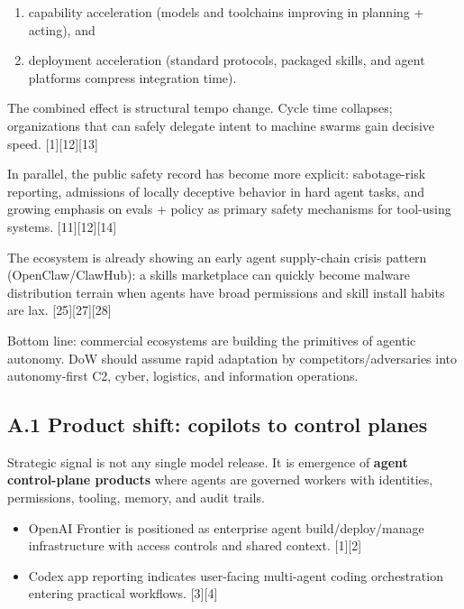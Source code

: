 \documentclass[
]{article}
\providecommand{\tightlist}{%
  \setlength{\itemsep}{0pt}\setlength{\parskip}{0pt}}
\begin{document}
\begin{enumerate}
\def\labelenumi{\arabic{enumi}.}
\tightlist
\item
  capability acceleration (models and toolchains improving in planning +
  acting), and
\item
  deployment acceleration (standard protocols, packaged skills, and
  agent platforms compress integration time).
\end{enumerate}

The combined effect is structural tempo change. Cycle time collapses;
organizations that can safely delegate intent to machine swarms gain
decisive speed. {[}1{]}{[}12{]}{[}13{]}

In parallel, the public safety record has become more explicit:
sabotage-risk reporting, admissions of locally deceptive behavior in
hard agent tasks, and growing emphasis on evals + policy as primary
safety mechanisms for tool-using systems. {[}11{]}{[}12{]}{[}14{]}

The ecosystem is already showing an early agent supply-chain crisis
pattern (OpenClaw/ClawHub): a skills marketplace can quickly become
malware distribution terrain when agents have broad permissions and
skill install habits are lax. {[}25{]}{[}27{]}{[}28{]}

Bottom line: commercial ecosystems are building the primitives of
agentic autonomy. DoW should assume rapid adaptation by
competitors/adversaries into autonomy-first C2, cyber, logistics, and
information operations.

\hypertarget{a.1-product-shift-copilots-to-control-planes}{%
\subsection{A.1 Product shift: copilots to control
planes}\label{a.1-product-shift-copilots-to-control-planes}}

Strategic signal is not any single model release. It is emergence of
\textbf{agent control-plane products} where agents are governed workers
with identities, permissions, tooling, memory, and audit trails.

\begin{itemize}
\tightlist
\item
  OpenAI Frontier is positioned as enterprise agent build/deploy/manage
  infrastructure with access controls and shared context. {[}1{]}{[}2{]}
\item
  Codex app reporting indicates user-facing multi-agent coding
  orchestration entering practical workflows. {[}3{]}{[}4{]}
\end{itemize}
\end{document}

